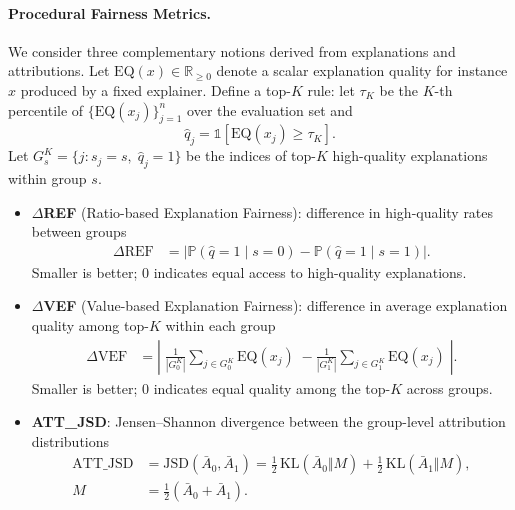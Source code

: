 \documentclass[11pt]{article}
\begin{document}
\paragraph{Procedural Fairness Metrics.} We consider three complementary notions derived from explanations and attributions. Let $\text{EQ}(x) \in \mathbb{R}_{\ge 0}$ denote a scalar explanation quality for instance $x$ produced by a fixed explainer. Define a top-$K$ rule: let $\tau_K$ be the $K$-th percentile of $\{\text{EQ}(x_j)\}_{j=1}^n$ over the evaluation set and
\begin{equation}
    \hat{q}_j = \mathbb{1}[\text{EQ}(x_j) \ge \tau_K].
\end{equation}
Let $G_s^K = \{ j : s_j = s,\; \hat{q}_j = 1 \}$ be the indices of top-$K$ high-quality explanations within group $s$.
\begin{itemize}
    \item \textbf{$\Delta$REF} (Ratio-based Explanation Fairness): difference in high-quality rates between groups
    \begin{align}
        \Delta\text{REF} &= \left| \mathbb{P}(\hat{q}=1\mid s=0) - \mathbb{P}(\hat{q}=1\mid s=1) \right|.
    \end{align}
    Smaller is better; $0$ indicates equal access to high-quality explanations.
    \item \textbf{$\Delta$VEF} (Value-based Explanation Fairness): difference in average explanation quality among top-$K$ within each group
    \begin{align}
        \Delta\text{VEF} &= \left|\; \frac{1}{|G_0^K|} \sum_{j\in G_0^K} \text{EQ}(x_j)\;-
        \frac{1}{|G_1^K|} \sum_{j\in G_1^K} \text{EQ}(x_j) \;\right|.
    \end{align}
    Smaller is better; $0$ indicates equal quality among the top-$K$ across groups.
    \item \textbf{ATT\_JSD}: Jensen–Shannon divergence between the group-level attribution distributions
    \begin{align}
        \text{ATT\_JSD} &= \text{JSD}(\bar{A}_0, \bar{A}_1)
        = \tfrac{1}{2}\,\text{KL}(\bar{A}_0 \Vert M) + \tfrac{1}{2}\,\text{KL}(\bar{A}_1 \Vert M), \\
        M &= \tfrac{1}{2}(\bar{A}_0 + \bar{A}_1).
    \end{align}
\end{itemize}
\end{document}
